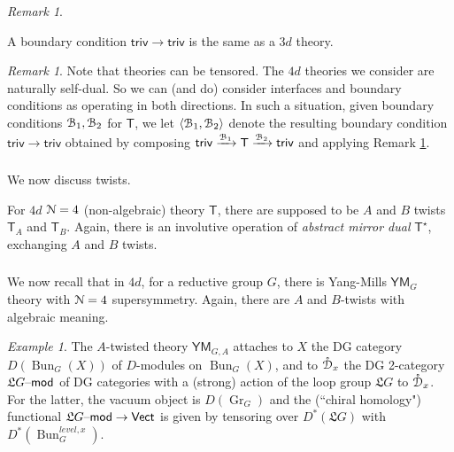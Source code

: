 \documentclass[reqno,11pt]{amsart}
\numberwithin{equation}{subsection}
\theoremstyle{remark}
\newtheorem{rem}[thm]{Remark}
\newtheorem{example}[thm]{Example}
\newcommand{\xar}[1]{\xrightarrow{#1}}
\newcommand{\sB}{{\EuScript B}}
\newcommand{\sD}{{\EuScript D}}
\newcommand{\sN}{{\EuScript N}}
\newcommand{\fL}{{\mathfrak L}}
\newcommand{\on}{\operatorname}
\newcommand{\mathendash}{\text{\textendash}}
\newcommand{\Vect}{\mathsf{Vect}}
\newcommand{\Gr}{\on{Gr}}
\newcommand{\Bun}{\on{Bun}}
\renewcommand{\mod}{\mathendash\mathsf{mod}}
\renewcommand{\o}[1]{\mathring{#1}}
\newcommand{\YM}{\mathsf{YM}}
\newcommand{\pair}[2]{\langle #1,#2 \rangle}
\begin{document}
\begin{rem}\label{r:3d-as-bdry}

A boundary condition $\mathsf{triv} \to \mathsf{triv}$ is the same
as a $3d$ theory. 

\end{rem}

\begin{rem}

Note that theories can be tensored. The $4d$ theories we consider are naturally
self-dual. So we can (and do) consider interfaces and boundary conditions as
operating in both directions. In such a situation, given boundary conditions 
$\sB_1,\sB_2$ for $\mathsf{T}$, we let $\pair{\sB_1}{\sB_2}$ denote 
the resulting boundary condition $\mathsf{triv} \to \mathsf{triv}$
obtained by composing $\mathsf{triv} \xar{\sB_1} \mathsf{T} \xar{\sB_2} \mathsf{triv}$
and applying Remark \ref{r:3d-as-bdry}.

\end{rem}


\subsubsection{} 

We now discuss twists.

For $4d$ $\sN = 4$ (non-algebraic) theory $\mathsf{T}$, there are supposed
to be $A$ and $B$ twists $\mathsf{T}_A$ and $\mathsf{T}_B$.
Again, there is an involutive operation of 
\emph{abstract mirror dual} $\mathsf{T}^{\star}$, exchanging $A$ and $B$ twists.


\subsubsection{}

We now recall that in $4d$, for a reductive group $G$, 
there is Yang-Mills $\YM_G$ theory with $\sN = 4$ 
supersymmetry. Again, there are $A$ and $B$-twists with algebraic
meaning.

\begin{example}

The $A$-twisted theory $\YM_{G,A}$ attaches to $X$ the DG category 
$D(\Bun_G(X))$ of $D$-modules on $\Bun_G(X)$, and to $\o{\sD}_x$ 
the DG 2-category $\fL G\mod$ of DG categories with a (strong)
action of the loop group $\fL G$ to $\o{\sD}_x$.
For the latter, the vacuum object is $D(\Gr_G)$ and the (``chiral homology")
functional $\fL G\mod \to \Vect$ is given by tensoring over $D^*(\fL G)$ with 
$D^*(\Bun_G^{level,x})$.

\end{example}
\end{document}
